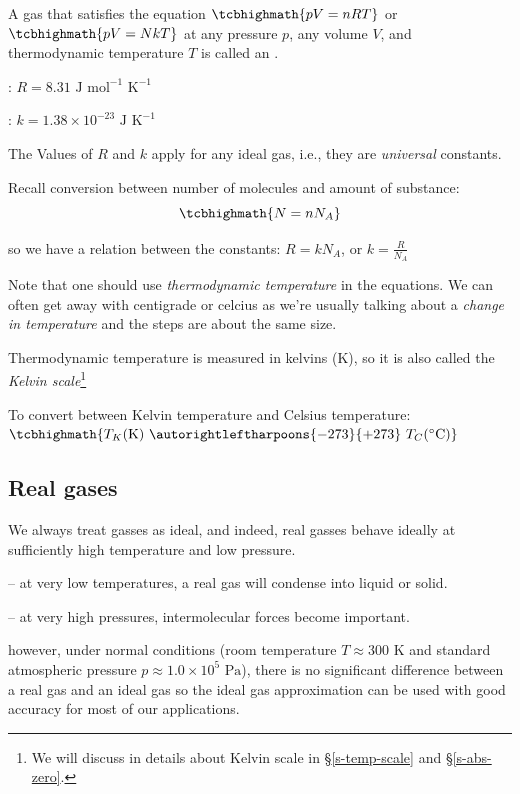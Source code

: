 \begin{ilight}
	A gas that satisfies the equation $\tcbhighmath{pV=nRT}$ or $\tcbhighmath{pV=NkT}$ at any pressure $p$, any volume $V$, and thermodynamic temperature $T$ is called an .
\end{ilight}

: $R=8.31 \text{ J mol}^{-1}\text{ K}^{-1}$

: $k=1.38\times10^{-23} \text{ J K}^{-1}$

The Values of $R$ and $k$ apply for any ideal gas, i.e., they are \emph{universal} constants.

Recall conversion between number of molecules and amount of substance: $$\tcbhighmath{N=nN_A}$$

so we have a relation between the constants: $R = kN_A$, or $k=\frac{R}{N_A}$

Note that one should use \emph{thermodynamic temperature} in the equations. We can often get away with centigrade or celcius as we're usually talking about a \emph{change in temperature} and the steps are about the same size.

Thermodynamic temperature is measured in kelvins (K), so it is also called the \emph{Kelvin scale}\footnote{We will discuss in details about Kelvin scale in \S\ref{s-temp-scale} and \S\ref{s-abs-zero}.}

To convert between Kelvin temperature and Celsius temperature: $\tcbhighmath{T_K (\text{K}) \text{ } \autorightleftharpoons{\footnotesize -273}{\footnotesize +273} \text{ } T_C (\OC)}$

\subsection*{Real gases}

We always treat gasses as ideal, and indeed, real gasses behave ideally at sufficiently high temperature and low pressure.

\begin{compactitem}
	\item[--] at very low temperatures, a real gas will condense into liquid or solid.
	
	\item[--] at very high pressures, intermolecular forces become important.
\end{compactitem}

however, under normal conditions (room temperature $T \approx 300 \text{ K}$ and standard atmospheric pressure $p \approx 1.0\times10^5 \text{ Pa}$), there is no significant difference between a real gas and an ideal gas so the ideal gas approximation can be used with good accuracy for most of our applications.

